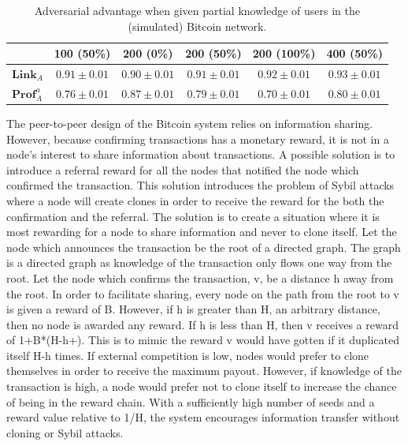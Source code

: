 \begin{table}
\begin{center}
\caption{Adversarial advantage when given partial knowledge of users in the (simulated) Bitcoin network.}
\label{tab:eval-privacy-results}
    \begin{tabular}{|l||ccccc|}\hline
    ~                   & 100 (50\%) & 200 (0\%) & 200 (50\%) & 200 (100\%) & 400 (50\%) \\ \hline
    $\mathbf{Link}_A$   & $0.91 \pm 0.01$ & $0.90 \pm 0.01$ & $0.91 \pm 0.01$ & $0.92 \pm 0.01$ & $0.93 \pm 0.01$ \\
    $\mathbf{Prof}_A^a$ & $0.76 \pm 0.01$ & $0.87 \pm 0.01$ & $0.79 \pm 0.01$ & $0.70 \pm 0.01$ & $0.80 \pm 0.01$ \\ \hline
    \end{tabular}
\end{center}
\end{table}

The peer-to-peer design of the Bitcoin system relies on information sharing.  However, because confirming transactions has a monetary reward, it is not in a node’s interest to share information about transactions.  A possible solution is to introduce a referral reward for all the nodes that notified the node which confirmed the transaction.  This solution introduces the problem of Sybil attacks where a node will create clones in order to receive the reward for the both the confirmation and the referral.  The solution is to create a situation where it is most rewarding for a node to share information and never to clone itself.  Let the node which announces the transaction be the root of a directed graph.  The graph is a directed graph as knowledge of the transaction only flows one way from the root.  Let the node which confirms the transaction, v, be a distance h away from the root.  In order to facilitate sharing, every node on the path from the root to v is given a reward of B.  However, if h is greater than H, an arbitrary distance, then no node is awarded any reward.  If h is less than H, then v receives a reward of 1+B*(H-h+).  This is to mimic the reward v would have gotten if it duplicated itself H-h times.  If external competition is low, nodes would prefer to clone themselves in order to receive the maximum payout.  However, if knowledge of the transaction is high, a node would prefer not to clone itself to increase the chance of being in the reward chain.  With a sufficiently high number of seeds and a reward value relative to 1/H, the system encourages information transfer without cloning or Sybil attacks.

